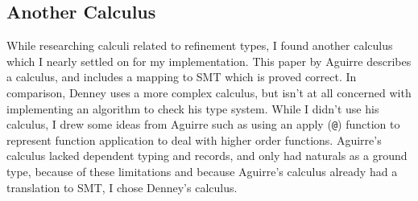 \subsection{Another Calculus}

While researching calculi related to refinement types, I found another calculus which I nearly
settled on for my implementation.
This paper by Aguirre \cite{aguirre16} describes a calculus, and includes a mapping to SMT which
is proved correct.
In comparison, Denney uses a more complex calculus, but isn't at all concerned with implementing
an algorithm to check his type system.
While I didn't use his calculus, I drew some ideas from Aguirre such as using an apply (\texttt{@})
function to represent function application to deal with higher order functions.
Aguirre's calculus lacked dependent typing and records, and only had naturals as a ground type,
because of these limitations and because Aguirre's calculus already had a translation to SMT, I
chose Denney's calculus.
